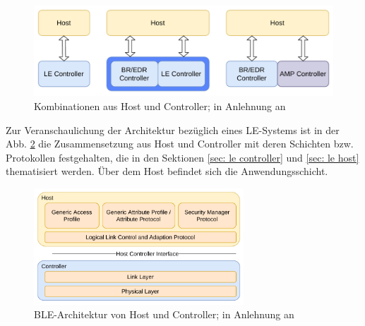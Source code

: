 \begin{figure}
    \centering
    \includegraphics[width=0.9\linewidth]{graphics/kombination_host_controller.pdf}
    \caption[Kombinationen aus Host und Controller]{Kombinationen aus Host und Controller; in Anlehnung an \cite{BtSpec4.0_fig_124}}
    \label{fig: kombinationen aus host und controller}
\end{figure}

Zur Veranschaulichung der Architektur bezüglich eines LE-Systems ist in der Abb. \ref{fig: host controller architektur} die Zusammensetzung aus Host und Controller mit deren Schichten bzw. Protokollen festgehalten, die in den Sektionen \ref{sec: le controller} und \ref{sec: le host} thematisiert werden. Über dem Host befindet sich die Anwendungsschicht.

\begin{figure}
    \centering
    \includegraphics[width=0.7\textwidth]{graphics/host_controller_hci.pdf}
    \caption[BLE-Architektur von Host und Controller]{BLE-Architektur von Host und Controller; in Anlehnung an \cite{BtSpec4.0_fig_137}}
    \label{fig: host controller architektur}
\end{figure}